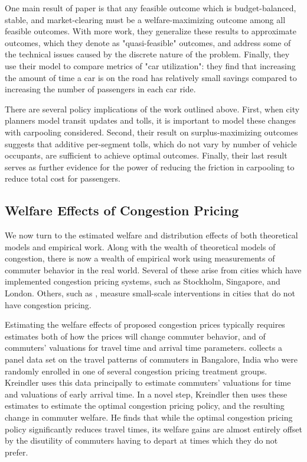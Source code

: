 \documentclass[JEL]{AEA}
\begin{document}
One main result of \cite{ostrovsky-2018} paper is that any feasible outcome which is budget-balanced, stable, and market-clearing must be a welfare-maximizing outcome among all feasible outcomes. With more work, they generalize these results to approximate outcomes, which they denote as "quasi-feasible" outcomes, and address some of the technical issues caused by the discrete nature of the problem. Finally, they use their model to compare metrics of "car utilization": they find that increasing the amount of time a car is on the road has relatively small savings compared to increasing the number of passengers in each car ride.

There are several policy implications of the work outlined above. First, when city planners model transit updates and tolls, it is important to model these changes with carpooling considered. Second, their result on surplus-maximizing outcomes suggests that additive per-segment tolls, which do not vary by number of vehicle occupants, are sufficient to achieve optimal outcomes. Finally, their last result serves as further evidence for the power of reducing the friction in carpooling to reduce total cost for passengers.

\subsection{Welfare Effects of Congestion Pricing}

We now turn to the estimated welfare and distribution effects of both theoretical models and empirical work. Along with the wealth of theoretical models of congestion, there is now a wealth of empirical work using measurements of commuter behavior in the real world. Several of these arise from cities which have implemented congestion pricing systems, such as Stockholm, Singapore, and London. Others, such as \cite{kreindler-2018}, measure small-scale interventions in cities that do not have congestion pricing.

Estimating the welfare effects of proposed congestion prices typically requires estimates both of how the prices will change commuter behavior, and of commuters' valuations for travel time and arrival time parameters. \cite{kreindler-2018} collects a panel data set on the travel patterns of commuters in Bangalore, India who were randomly enrolled in one of several congestion pricing treatment groups. Kreindler uses this data principally to estimate commuters' valuations for time and valuations of early arrival time. In a novel step, Kreindler then uses these estimates to estimate the optimal congestion pricing policy, and the resulting change in commuter welfare. He finds that while the optimal congestion pricing policy significantly reduces travel times, its welfare gains are almost entirely offset by the disutility of commuters having to depart at times which they do not prefer.
\end{document}
